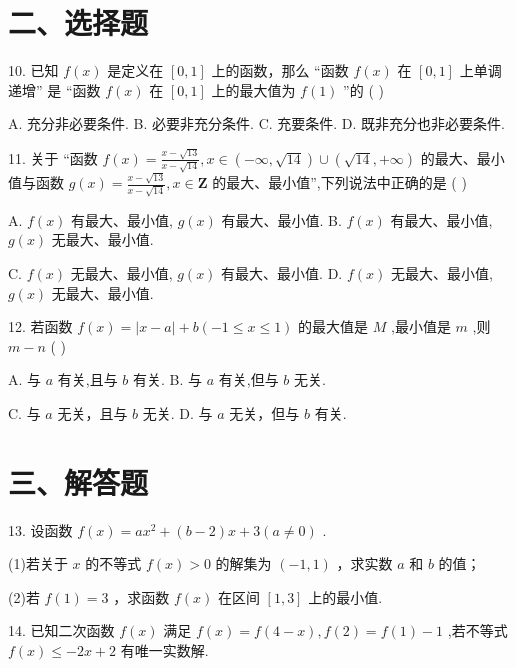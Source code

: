 \section*{二、选择题}

10. 已知 $f\left( x\right)$ 是定义在 $\left\lbrack  {0,1}\right\rbrack$ 上的函数，那么 “函数 $f\left( x\right)$ 在 $\left\lbrack  {0,1}\right\rbrack$ 上单调递增” 是 “函数 $f\left( x\right)$ 在 $\left\lbrack  {0,1}\right\rbrack$ 上的最大值为 $f\left( 1\right)$ ”的 ( )

A. 充分非必要条件. B. 必要非充分条件. C. 充要条件. D. 既非充分也非必要条件.

11. 关于 “函数 $f\left( x\right)  = \frac{x - \sqrt{13}}{x - \sqrt{14}},x \in  \left( {-\infty ,\sqrt{14}}\right)  \cup  \left( {\sqrt{14}, + \infty }\right)$ 的最大、最小值与函数 $g\left( x\right)  =  \frac{x - \sqrt{13}}{x - \sqrt{14}},x \in  \mathbf{Z}$ 的最大、最小值”,下列说法中正确的是 ( )

A. $f\left( x\right)$ 有最大、最小值, $g\left( x\right)$ 有最大、最小值. B. $f\left( x\right)$ 有最大、最小值, $g\left( x\right)$ 无最大、最小值.

C. $f\left( x\right)$ 无最大、最小值, $g\left( x\right)$ 有最大、最小值. D. $f\left( x\right)$ 无最大、最小值, $g\left( x\right)$ 无最大、最小值.



12. 若函数 $f\left( x\right)  = \left| {x - a}\right|  + b\left( {-1 \leq  x \leq  1}\right)$ 的最大值是 $M$ ,最小值是 $m$ ,则 $m - n$ ( )

A. 与 $a$ 有关,且与 $b$ 有关. B. 与 $a$ 有关,但与 $b$ 无关.

C. 与 $a$ 无关，且与 $b$ 无关. D. 与 $a$ 无关，但与 $b$ 有关.

\section*{三、解答题}

13. 设函数 $f\left( x\right)  = a{x}^{2} + \left( {b - 2}\right) x + 3\left( {a \neq  0}\right)$ .

(1)若关于 $x$ 的不等式 $f\left( x\right)  > 0$ 的解集为 $\left( {-1,1}\right)$ ，求实数 $a$ 和 $b$ 的值；

(2)若 $f\left( 1\right)  = 3$ ，求函数 $f\left( x\right)$ 在区间 $\left\lbrack  {1,3}\right\rbrack$ 上的最小值.

14. 已知二次函数 $f\left( x\right)$ 满足 $f\left( x\right)  = f\left( {4 - x}\right) ,f\left( 2\right)  = f\left( 1\right)  - 1$ ,若不等式 $f\left( x\right)  \leq   - {2x} + 2$ 有唯一实数解.

